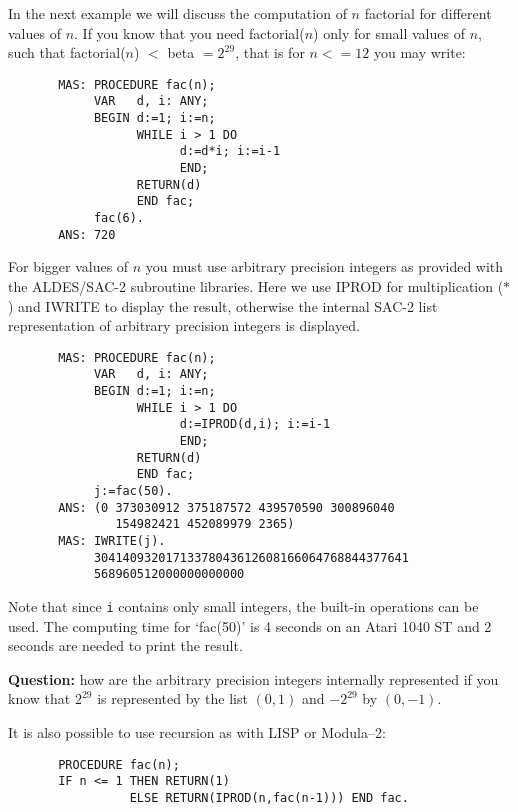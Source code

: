 In the next example we will discuss the computation of
$n$ factorial for different values of $n$.   
If you know that you need factorial($n$) only for 
small values of $n$, 
such that factorial($n$) $<$ beta $= 2^{29}$, 
that is for $n <= 12$ you may write:

\begin{verbatim}
       MAS: PROCEDURE fac(n);
            VAR   d, i: ANY;
            BEGIN d:=1; i:=n;
                  WHILE i > 1 DO
                        d:=d*i; i:=i-1          
                        END;
                  RETURN(d)
                  END fac;
            fac(6).
       ANS: 720
\end{verbatim}
   
For bigger values of $n$ you must use arbitrary precision 
integers as 
provided with the ALDES/SAC-2 subroutine libraries. Here we use
IPROD for multiplication ($*$) and 
IWRITE to display 
the result, otherwise the internal
SAC-2 list representation of arbitrary 
precision integers is displayed.
 
\begin{verbatim}
       MAS: PROCEDURE fac(n);
            VAR   d, i: ANY;
            BEGIN d:=1; i:=n;
                  WHILE i > 1 DO
                        d:=IPROD(d,i); i:=i-1   
                        END;
                  RETURN(d)
                  END fac;
            j:=fac(50).
       ANS: (0 373030912 375187572 439570590 300896040 
               154982421 452089979 2365)
       MAS: IWRITE(j).
            30414093201713378043612608166064768844377641
            568960512000000000000
\end{verbatim}

Note that since \verb/i/ contains only small integers, 
the built-in operations
can be used. The computing time for `fac(50)' is 4 seconds
on an Atari 1040 ST and 2 seconds are needed to print the result. 

{\bf Question:} 
how are the arbitrary precision integers internally 
represented if you know that $2^{29}$ is represented by the 
list $(0,1)$ and $-2^{29}$ by $(0,-1)$. 

It is also possible to use 
recursion as with LISP or Modula--2:

\begin{verbatim}
       PROCEDURE fac(n);
       IF n <= 1 THEN RETURN(1)
                 ELSE RETURN(IPROD(n,fac(n-1))) END fac. 
\end{verbatim}

